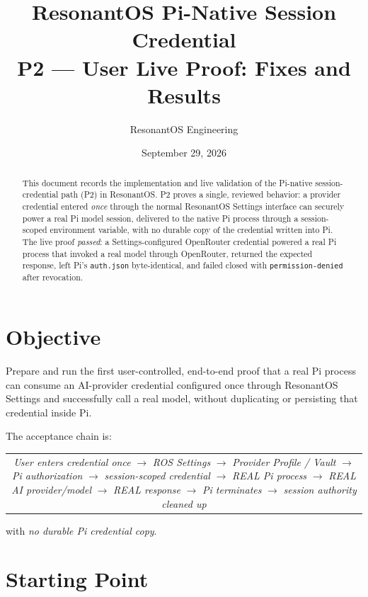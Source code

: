 \documentclass[11pt]{article}
\title{\textbf{ResonantOS Pi-Native Session Credential}\\[2mm]
\large P2 --- User Live Proof: Fixes and Results}
\author{ResonantOS Engineering}
\date{September 29, 2026}
\newcommand{\code}[1]{\texttt{#1}}
\newcommand{\term}[1]{\textit{#1}}
\begin{document}
\maketitle

\begin{abstract}
This document records the implementation and live validation of the
Pi-native session-credential path (P2) in ResonantOS. P2 proves a single,
reviewed behavior: a provider credential entered \emph{once} through the normal
ResonantOS Settings interface can securely power a real Pi model session,
delivered to the native Pi process through a session-scoped environment
variable, with no durable copy of the credential written into Pi. The live proof
\emph{passed}: a Settings-configured OpenRouter credential powered a real Pi
process that invoked a real model through OpenRouter, returned the expected
response, left Pi's \code{auth.json} byte-identical, and failed closed with
\code{permission-denied} after revocation.
\end{abstract}

\tableofcontents

\section{Objective}

Prepare and run the first user-controlled, end-to-end proof that a real Pi
process can consume an AI-provider credential configured once through
ResonantOS Settings and successfully call a real model, without duplicating or
persisting that credential inside Pi.

The acceptance chain is:

\begin{center}
\begin{tabular}{c}
\term{User enters credential once} $\rightarrow$ \term{ROS Settings}
$\rightarrow$ \term{Provider Profile / Vault} $\rightarrow$
\term{Pi authorization} $\rightarrow$ \term{session-scoped credential}
$\rightarrow$ \term{REAL Pi process} $\rightarrow$
\term{REAL AI provider/model} $\rightarrow$ \term{REAL response}
$\rightarrow$ \term{Pi terminates} $\rightarrow$
\term{session authority cleaned up}
\end{tabular}
\end{center}

\noindent with \emph{no durable Pi credential copy}.

\section{Starting Point}
\end{document}
